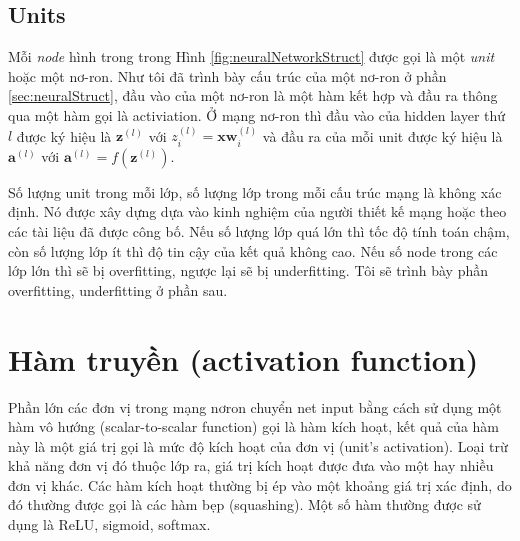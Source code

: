 \subsection{Units}
Mỗi \textit{node} hình trong trong Hình \ref{fig:neuralNetworkStruct} được gọi là một \textit{unit} hoặc một nơ-ron. Như tôi đã trình bày cấu trúc của một nơ-ron ở phần \ref{sec:neuralStruct}, đầu vào của một nơ-ron là một hàm kết hợp và đầu ra thông qua một hàm gọi là activiation. Ở mạng nơ-ron thì đầu vào của hidden layer thứ $l$ được ký hiệu là $\textbf{z}^{(l)}$ với $z^{(l)}_i = \textbf{x}\textbf{w}^{(l)}_i$ và đầu ra của mỗi unit được ký hiệu là $\textbf{a}^{(l)}$ với $\textbf{a}^{(l)}= f(\textbf{z}^{(l)})$.\par

	Số lượng unit trong mỗi lớp, số lượng lớp trong mỗi cấu trúc mạng là không xác định. Nó được xây dựng dựa vào kinh nghiệm của người thiết kế mạng hoặc theo các tài liệu đã được công bố. Nếu số lượng lớp quá lớn thì tốc độ tính toán chậm, còn số lượng lớp ít thì độ tin cậy của kết quả không cao. Nếu số node trong các lớp lớn thì sẽ bị overfitting, ngược lại sẽ bị underfitting. Tôi sẽ trình bày phần overfitting, underfitting ở phần sau.
\section{Hàm truyền (activation function)}
\label{sec:activationFunc}
Phần lớn các đơn vị trong mạng nơron chuyển net input  bằng cách sử dụng một hàm vô hướng (scalar-to-scalar function) gọi là hàm kích hoạt, kết quả của hàm này là một giá trị gọi là mức độ kích hoạt của đơn vị (unit's activation). Loại trừ khả năng đơn vị đó thuộc lớp ra, giá trị kích hoạt được đưa vào một hay nhiều đơn vị khác. Các hàm kích hoạt thường bị ép vào một khoảng giá trị xác định, do đó thường được gọi là các hàm bẹp (squashing). Một số hàm thường được sử dụng là ReLU, sigmoid, softmax.\par
